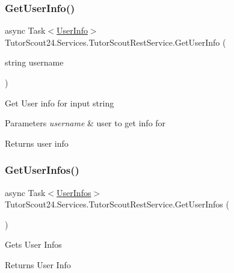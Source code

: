 \subsubsection{\texorpdfstring{Get\+User\+Info()}{GetUserInfo()}}
{\footnotesize\ttfamily async Task$<$\mbox{\hyperlink{class_tutor_scout24_1_1_models_1_1_user_data_1_1_user_info}{User\+Info}}$>$ Tutor\+Scout24.\+Services.\+Tutor\+Scout\+Rest\+Service.\+Get\+User\+Info (\begin{DoxyParamCaption}\item[{string}]{username }\end{DoxyParamCaption})\hspace{0.3cm}{\ttfamily [inline]}}



Get User info for input string 


\begin{DoxyParams}{Parameters}
{\em username} & user to get info for\\
\hline
\end{DoxyParams}
\begin{DoxyReturn}{Returns}
user info
\end{DoxyReturn}
\mbox{\label{class_tutor_scout24_1_1_services_1_1_tutor_scout_rest_service_a42b608e3ef3bb174d1a101e4b36046c3}} 
\subsubsection{\texorpdfstring{Get\+User\+Infos()}{GetUserInfos()}}
{\footnotesize\ttfamily async Task$<$\mbox{\hyperlink{class_tutor_scout24_1_1_models_1_1_user_data_1_1_user_infos}{User\+Infos}}$>$ Tutor\+Scout24.\+Services.\+Tutor\+Scout\+Rest\+Service.\+Get\+User\+Infos (\begin{DoxyParamCaption}{ }\end{DoxyParamCaption})\hspace{0.3cm}{\ttfamily [inline]}}



Gets User Infos 

\begin{DoxyReturn}{Returns}
User Info
\end{DoxyReturn}
\mbox{\label{class_tutor_scout24_1_1_services_1_1_tutor_scout_rest_service_aaccc0997a181be6e1076fc74b433ab80}} 
